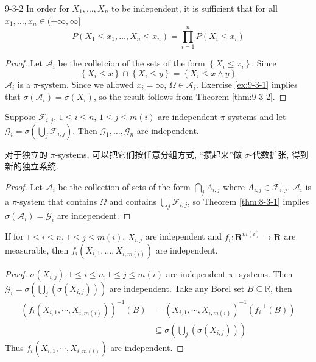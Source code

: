 \documentclass[../main.tex]{subfiles}
\begin{document}
\begin{theorem}{}{9-3-2}
In order for $X_1, \dots, X_n$ to be independent, it is sufficient that for all $x_1, \dots, x_n \in (-\infty, \infty]$
\[ P(X_1 \le x_1, \dots, X_n \le x_n) = \prod_{i=1}^n P(X_i \le x_i) \]
\end{theorem}
\begin{proof}
    Let \(  \mathcal{A}_{i}  \) be the colletcion of the sets of the form \(\left\{ X_{i}\le x_{i} \right\}  \). Since \[
    \left\{ X_{i}\le x\right\}\cap \left\{ X_{i}\le y \right\}= \left\{ X_{i}\le x\wedge y \right\}
    \]\(  \mathcal{A}_{i}  \) is a \(   \pi  \)-system. Since we allowed \(  x_{i}= \infty  \), \(   \Omega \in \mathcal{A}_{i}  \). Exercise \ref{ex:9-3-1} implies that \(   \sigma \left( \mathcal{A}_{i} \right)=  \sigma \left( X_{i} \right)    \), so the result follows from   Theorem \ref{thm:9-3-2}.  
\end{proof}
\begin{theorem}{}{}
Suppose $\mathcal{F}_{i,j}$, $1 \leq i \leq n$, $1 \leq j \leq m(i)$ are independent \(   \pi  \)-systems   and let $\mathcal{G}_i = \sigma(\bigcup_j \mathcal{F}_{i,j})$. Then $\mathcal{G}_1, \dots, \mathcal{G}_n$ are independent.
\end{theorem}
\begin{note}
    对于独立的 \(   \pi  \)-systems, 可以把它们按任意分组方式, ``攒起来''做 \(   \sigma   \)-代数扩张, 得到新的独立系统.  
\end{note}
\begin{proof}
Let $\mathcal{A}_i$ be the collection of sets of the form $\bigcap_j A_{i,j}$ where $A_{i,j} \in \mathcal{F}_{i,j}$. $\mathcal{A}_i$ is a $\pi$-system that contains $\Omega$ and contains $\bigcup_j \mathcal{F}_{i,j}$, so Theorem \ref{thm:8-3-1} implies $\sigma(\mathcal{A}_i) = \mathcal{G}_i$ are independent.
\end{proof}
\begin{theorem}{}{}
If for $1 \le i \le n$, $1 \le j \le m(i)$, $X_{i,j}$ are independent and $f_i : \mathbf{R}^{m(i)} \to \mathbf{R}$ are measurable, then $f_i(X_{i,1}, \dots, X_{i,m(i)})$ are independent.
\end{theorem}
\begin{proof}
     \(   \sigma \left(X_{i,j} \right), 1\le i\le n,1\le j\le m\left( i \right)    \) are independent \(   \pi  \)- systems. Then \(  \mathcal{G}_{i} =  \sigma \left( \bigcup _{j}\left(  \sigma \left( X_{i,j} \right)  \right)  \right)   \) are independent. Take any Borel set \(  B \subseteq \mathbb{R}   \), then \[
  \begin{aligned}
     \left( f_{i}\left( X_{i,1},\cdots ,X_{i,m\left( i \right) } \right)  \right)^{-1} \left( B \right)&=  \left( X_{i,1},\cdots ,X_{i,m\left( i \right) } \right)^{-1} \left( f_{i}^{-1} \left( B \right)  \right)\\ 
      &\subseteq   \sigma \left( \bigcup _{j}\left(  \sigma \left( X_{i,j} \right)  \right)  \right)   
  \end{aligned}  
     \] Thus \(  f_{i}\left( X_{i,1},\cdots ,X_{i,m\left( i \right) } \right)   \) are independent.  
\end{proof}
\end{document}
